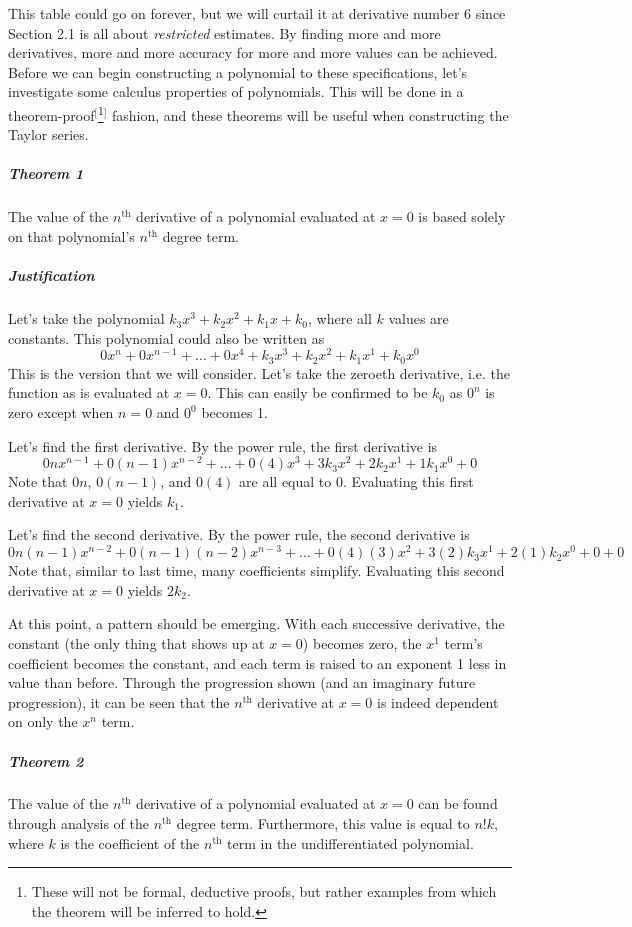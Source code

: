 \documentclass{article}
\newcounter{example}%
\begin{document}
This table could go on forever, but we will curtail it at derivative number 6 since Section 2.1 is all about \emph{restricted} estimates. By finding more and more derivatives, more and more accuracy for more and more values can be achieved. Before we can begin constructing a polynomial to these specifications, let's investigate some calculus properties of polynomials. This will be done in a theorem-proof$^[$\footnote{These will not be formal, deductive proofs, but rather examples from which the theorem will be inferred to hold.}$^]$ fashion, and these theorems will be useful when constructing the Taylor series.\par
\subparagraph{Theorem 1} The value of the $n^\text{th}$ derivative of a polynomial evaluated at $x=0$ is based solely on that polynomial's $n^\text{th}$ degree term.
\subparagraph{Justification} Let's take the polynomial $k_3x^3+k_2x^2+k_1x+k_0$, where all $k$ values are constants. This polynomial could also be written as $$0x^n+0x^{n-1}+\ldots+0x^4+k_3x^3+k_2x^2+k_1x^1+k_0x^0$$This is the version that we will consider. Let's take the zeroeth derivative, i.e. the function as is evaluated at $x=0$. This can easily be confirmed to be $k_0$ as $0^n$ is zero except when $n=0$ and $0^0$ becomes 1.\par
Let's find the first derivative. By the power rule, the first derivative is$$0nx^{n-1}+0(n-1)x^{n-2}+\ldots+0(4)x^3+3k_3x^2+2k_2x^1+1k_1x^0+0$$Note that $0n$, $0(n-1)$, and $0(4)$ are all equal to 0. Evaluating this first derivative at $x=0$ yields $k_1$.\par
Let's find the second derivative. By the power rule, the second derivative is$$0n(n-1)x^{n-2}+0(n-1)(n-2)x^{n-3}+\ldots+0(4)(3)x^2+3(2)k_3x^1+2(1)k_2x^0+0+0$$Note that, similar to last time, many coefficients simplify. Evaluating this second derivative at $x=0$ yields $2k_2$.\par
At this point, a pattern should be emerging. With each successive derivative, the constant (the only thing that shows up at $x=0$) becomes zero, the $x^1$ term's coefficient becomes the constant, and each term is raised to an exponent 1 less in value than before. Through the progression shown (and an imaginary future progression), it can be seen that the $n^\text{th}$ derivative at $x=0$ is indeed dependent on only the $x^n$ term.
\subparagraph{Theorem 2} The value of the $n^\text{th}$ derivative of a polynomial evaluated at $x=0$ can be found through analysis of the $n^\text{th}$ degree term. Furthermore, this value is equal to $n!k$, where $k$ is the coefficient of the $n^\text{th}$ term in the undifferentiated polynomial.
\end{document}
